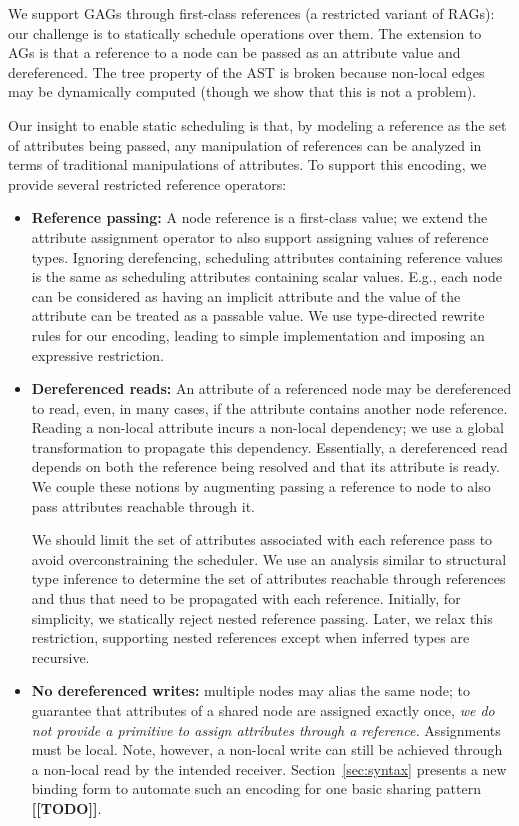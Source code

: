 We support GAGs through first-class references (a restricted variant of RAGs): our challenge is to statically schedule operations over them. The extension to AGs is that a reference to a node can be passed as an attribute value and dereferenced. The tree property of the AST is broken because non-local edges may be dynamically computed (though we show that this is not a problem). 

Our insight to enable static scheduling is that, by modeling a reference as the set of attributes being passed, any manipulation of references can be analyzed in terms of traditional manipulations of attributes. To support this encoding, we provide several restricted reference operators:

\begin{itemize}
\item \textbf{Reference passing:} A node reference is a first-class value; we extend the attribute assignment operator to also support assigning values of reference types. Ignoring derefencing, scheduling attributes containing reference values is the same as scheduling attributes containing scalar values. E.g., each node can be considered as having an implicit attribute  and the value of the  attribute can be treated as a passable value. We use type-directed rewrite rules for our encoding, leading to simple implementation and imposing an expressive restriction.

\item \textbf{Dereferenced reads:} An attribute of a referenced node may be dereferenced to read, even, in many cases, if the attribute contains another node reference. Reading a non-local attribute incurs a non-local dependency; we use a global transformation to propagate this dependency. Essentially, a dereferenced read depends on both the reference being resolved and that its attribute is ready. We couple these notions by augmenting passing a reference to node to also pass attributes reachable through it.

We should limit the set of attributes associated with each reference pass to avoid overconstraining the scheduler. We use an analysis similar to structural type inference to determine the set of attributes reachable through references and thus that need to be propagated with each reference. Initially, for simplicity, we statically reject nested reference passing. Later, we relax this restriction, supporting nested references except when inferred types are recursive.

\item \textbf{No dereferenced writes:} multiple nodes may alias the same node; to guarantee that attributes of a shared node are assigned exactly once, \emph{we do not provide a primitive to assign attributes through a reference.} Assignments must be local. Note, however, a non-local write can still be achieved through a non-local read by the intended receiver. Section~\ref{sec:syntax} presents a new binding form to automate such an encoding for one basic sharing pattern \textbf{[[TODO]]}.
\end{itemize}

